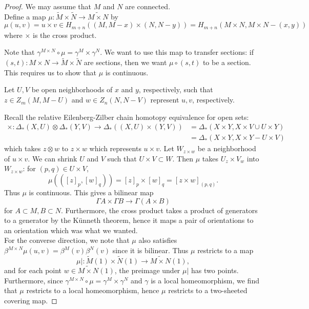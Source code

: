 \documentclass[reqno]{amsart}
\theoremstyle{definition}
\theoremstyle{remark}
\begin{document}
\begin{proof}
    We may assume that $M$ and $N$ are connected.\\
    Define a map
    $\mu \colon \tilde{M} \times \tilde{N} \to 
    \widetilde{M \times N}$ by
    \[
    \mu \left( u,v \right) = u \times v
    \in H_{m+n} \left( \left( M, M-x \right) \times 
    \left( N, N-y \right) \right) =
    H_{m+n}\left( M \times N, M \times N - (x,y) \right) 
    \] 
    where $\times $ is the cross product.

    Note that
    $\gamma^{M \times N} \circ \mu = \gamma^{M} \times 
    \gamma^{N}$.
    We want to use this map to transfer sections: if
    $(s,t) \colon M \times N \to \tilde{M} \times \tilde{N}$ are
    sections, then we want
    $\mu \circ (s,t)$ to be a section.
    This requires us to show that $\mu$ is continuous.

    Let $U,V$ be open neighborhoods of $x$ and $y$, respectively, such that
    $z \in Z_m(M, M-U)$ and
    $w \in Z_n (N, N-V)$ represent $u,v$, respectively.

    Recall the relative Eilenberg-Zilber chain homotopy equivalence
    for open sets:
    \begin{align*}
    \times \colon \Delta_* (X,U) \otimes
    \Delta_* (Y,V) \to \Delta_* \left( (X,U) \times (Y,V) \right) 
    &= \Delta_* \left( X \times Y, X \times V \cup 
    U \times Y\right)\\
    &=
    \Delta_* \left( X \times Y, X \times Y - U \times V \right) 
    \end{align*}
    which takes
    $z \otimes w$ to $z \times w$ which represents
    $u \times v$. Let
    $W_{z \times w}$ be a neighborhood of
    $u \times v$. We can shrink
    $U$ and $V$ such that
    $U \times V \subset W$.
    Then 
    $\mu$ takes
    $U_z \times V_{w}$ into
    $W_{z \times w}$: for $(p,q) \in U \times V$,
    \[
    \mu \left( \left( \left[ z \right]_p,
    \left[ w \right]_q \right)  \right) 
    =\left[ z \right]_p \times  \left[ w \right]_q
    = \left[ z \times w \right]_{(p,q)}.
    \] 
    Thus $\mu$ is continuous.
    This gives a bilinear map
    \[
    \Gamma A \times \Gamma B \to \Gamma \left( A \times B \right) 
    \] 
    for $A \subset M, B \subset N$.
    Furthermore,
    the cross product takes a product of generators
    to a generator by the Künneth theorem, hence it maps
    a pair of orientations to an orientation which was what we wanted.\\
    \linebreak
    For the converse direction, we 
    note that
    $\mu$ also satisfies
    $\beta^{M \times N} \mu \left( u, v \right) 
    = \beta^{M}(v) \beta^{N}(v)$ since 
    it is bilinear. Thus
    $\mu$ restricts to a map
    \[
    \mu| \colon \tilde{M}(1) \times \tilde{N}(1) \to 
    \widetilde{M \times N}(1),
    \] 
    and for each point 
    $w \in \widetilde{M \times N}(1)$, the preimage
    under $\mu |$ has two points. 
    Furthermore,
    since $\gamma^{M \times N} \circ \mu = 
    \gamma^{M} \times \gamma^{N}$ and
    $\gamma$ is a local homeomorphism, we find that
    $\mu$ restricts to
    a local homeomorphism, hence $\mu$ restricts to a two-sheeted 
    covering map.


\end{proof}
\end{document}
